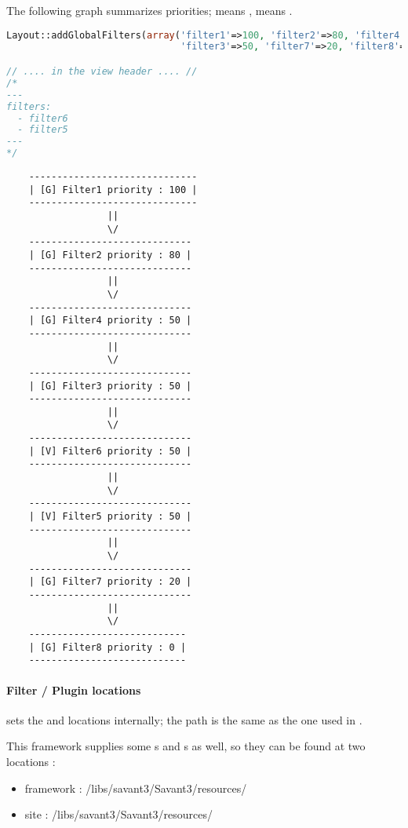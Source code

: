 \documentclass[pdftex,12pt,a4paper]{article}
\begin{document}
The following graph summarizes priorities; \variable{[G]} means , \variable{[V]} means .
\begin{lstlisting}[label="set-filters",caption="Set global and view filters",language=PHP]
Layout::addGlobalFilters(array('filter1'=>100, 'filter2'=>80, 'filter4'=>50,
							   'filter3'=>50, 'filter7'=>20, 'filter8'=>0));

// .... in the view header .... //
/*
---
filters:
  - filter6
  - filter5
---
*/
\end{lstlisting}
\begin{center}
{\scriptsize
\begin{verbatim}
	------------------------------
	| [G] Filter1 priority : 100 |
	------------------------------
	              ||
	              \/
	-----------------------------
	| [G] Filter2 priority : 80 |
	-----------------------------
	              ||
	              \/
	-----------------------------
	| [G] Filter4 priority : 50 |
	-----------------------------
	              ||
	              \/
	-----------------------------
	| [G] Filter3 priority : 50 |
	-----------------------------
	              ||
	              \/
	-----------------------------
	| [V] Filter6 priority : 50 |
	-----------------------------
	              ||
	              \/
	-----------------------------
	| [V] Filter5 priority : 50 |
	-----------------------------
	              ||
	              \/
	-----------------------------
	| [G] Filter7 priority : 20 |
	-----------------------------
	              ||
	              \/
	----------------------------
	| [G] Filter8 priority : 0 |
	----------------------------
\end{verbatim}
}
\end{center}

\paragraph{Filter / Plugin locations}

 sets the  and  locations internally; the path is the same as the one used in .

This framework supplies some s and s as well, so they can be found at two locations :
\begin{itemize}
	\item framework : /libs/savant3/Savant3/resources/
	\item site : /libs/savant3/Savant3/resources/
\end{itemize}
\end{document}

